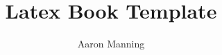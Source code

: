 \documentclass[titlepage, 12pt, twoside, openright, a4paper]{report}
\title{Latex Book Template}
\author{Aaron Manning}
\date{}
\begin{document}
    \maketitle
    \tableofcontents

    \allowdisplaybreaks

    \raggedright

    
    \raggedbottom


    
\end{document}
